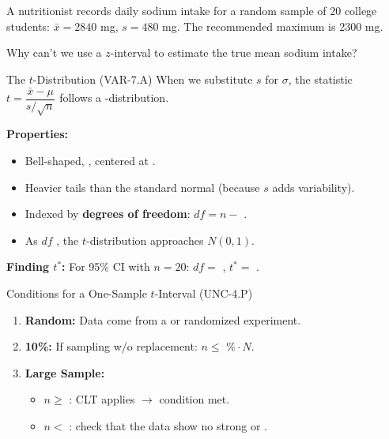 \documentclass[10pt]{article}
\begin{document}
\begin{hookbox}
A nutritionist records daily sodium intake for a random sample of 20 college students:
$\bar x = 2840$ mg, $s = 480$ mg. The recommended maximum is 2300 mg.

Why can't we use a $z$-interval to estimate the true mean sodium intake? \\
\end{hookbox}

\begin{notesbox}{The $t$-Distribution (VAR-7.A)}
When we substitute $s$ for $\sigma$, the statistic $t = \dfrac{\bar x - \mu}{s/\sqrt{n}}$
follows a -distribution.

\vspace{0.1in}
\textbf{Properties:}
\begin{itemize}
    \item Bell-shaped, , centered at .
    \item Heavier tails than the standard normal (because $s$ adds variability).
    \item Indexed by \textbf{degrees of freedom}: $df = n - $ .
    \item As $df$ , the $t$-distribution approaches $N(0, 1)$.
\end{itemize}

\textbf{Finding $t^*$:} For 95\% CI with $n = 20$: $df = $ , $t^* = $ .
\end{notesbox}

\begin{notesbox}{Conditions for a One-Sample $t$-Interval (UNC-4.P)}
\begin{enumerate}
    \item \textbf{Random:} Data come from a  or randomized experiment.
    \item \textbf{10\%:} If sampling w/o replacement: $n \le $ $\% \cdot N$.
    \item \textbf{Large Sample:}
          \begin{itemize}
              \item $n \ge $ : CLT applies $\to$ condition met.
              \item $n < $ : check that the data show no strong
                     or .
          \end{itemize}
\end{enumerate}
\end{notesbox}
\end{document}
